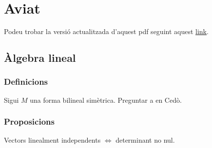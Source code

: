 \documentclass[../Apunts.tex]{subfiles}
\begin{document}
	\chapter{Aviat}
	Podeu trobar la versió actualitzada d'aquest pdf seguint aquest \href{https://claudilleyda.github.io}{link}.
	\section{Àlgebra lineal}
	\subsection{Definicions}
	\begin{definition}
		\label{def:bilineal definida estrictament positiva/negativa}
		Sigui \(M\) una forma bilineal simètrica. Preguntar a en Cedò.
	\end{definition}
	\begin{definition}
		\label{def:Norma d'una aplicació lineal}
	\end{definition}
	\subsection{Proposicions}
	\begin{proposition}\label{prop:determinant diferent de zero linealment independents}
		Vectors linealment independents \(\Leftrightarrow\) determinant no nul.
	\end{proposition}
\end{document}
